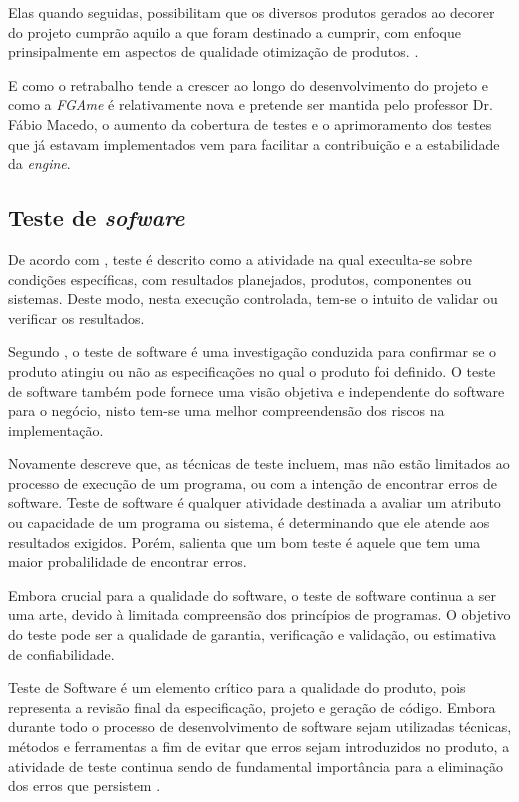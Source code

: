 Elas quando seguidas, possibilitam que os diversos produtos gerados ao decorer do projeto cumprão aquilo a que foram destinado a cumprir, com enfoque prinsipalmente em aspectos de qualidade otimização de produtos.
.\cite{gregor}

E como o retrabalho tende a crescer ao longo do desenvolvimento do projeto e como a \textit{FGAme} é relativamente nova e pretende ser mantida pelo professor Dr. Fábio Macedo, o aumento da cobertura de testes e o aprimoramento dos testes que já estavam implementados vem para facilitar a contribuição e a estabilidade da \textit{engine}.


\subsection{Teste de \textit{sofware}}
	De acordo com \cite{IEEE}, teste é descrito como a atividade na qual execulta-se sobre condições específicas, com resultados planejados, produtos, componentes ou sistemas. Deste modo, nesta execução controlada, tem-se o intuito de validar ou verificar os resultados.


Segundo \cite{artigo_intro_teste}, o teste de software é uma investigação conduzida para confirmar se o produto atingiu ou não as especificações no qual o produto foi definido. O teste de software também pode fornece uma visão objetiva e independente do software para o negócio, nisto tem-se uma melhor compreendensão dos riscos na implementação.

Novamente \cite{artigo_intro_teste} descreve que, as técnicas de teste incluem, mas não estão limitados ao processo de execução de um programa, ou com a intenção de encontrar erros de software. Teste de software é qualquer atividade destinada a avaliar um atributo ou capacidade de um programa ou sistema, é determinando que ele atende aos resultados exigidos. Porém, \cite{artigo_intro_teste} salienta que um bom teste é aquele que tem uma maior probalilidade de encontrar erros.

Embora crucial para a qualidade do software, o teste de software continua a ser uma arte, devido à limitada compreensão dos princípios de programas.
 O objetivo do teste pode ser a qualidade de garantia, verificação e validação, ou estimativa de confiabilidade.

Teste de Software é um elemento crítico para a qualidade do produto, pois representa a revisão final da especificação, projeto e geração de código. Embora durante todo o processo de desenvolvimento de software sejam utilizadas técnicas, métodos e ferramentas a fim de evitar que erros sejam introduzidos no produto, a atividade de teste continua sendo de fundamental importância para a eliminação dos erros que persistem \cite{maldonado}.

